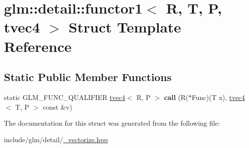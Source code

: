 \hypertarget{structglm_1_1detail_1_1functor1_3_01R_00_01T_00_01P_00_01tvec4_01_4}{}\section{glm\+:\+:detail\+:\+:functor1$<$ R, T, P, tvec4 $>$ Struct Template Reference}
\label{structglm_1_1detail_1_1functor1_3_01R_00_01T_00_01P_00_01tvec4_01_4}
\subsection*{Static Public Member Functions}
\begin{DoxyCompactItemize}
\item 
\mbox{\label{structglm_1_1detail_1_1functor1_3_01R_00_01T_00_01P_00_01tvec4_01_4_a65634749e4ae6e35d4cc898481d4681f}} 
static G\+L\+M\+\_\+\+F\+U\+N\+C\+\_\+\+Q\+U\+A\+L\+I\+F\+I\+ER \hyperlink{structglm_1_1tvec4}{tvec4}$<$ R, P $>$ {\bfseries call} (R($\ast$Func)(T x), \hyperlink{structglm_1_1tvec4}{tvec4}$<$ T, P $>$ const \&v)
\end{DoxyCompactItemize}


The documentation for this struct was generated from the following file\+:\begin{DoxyCompactItemize}
\item 
include/glm/detail/\hyperlink{__vectorize_8hpp}{\+\_\+vectorize.\+hpp}\end{DoxyCompactItemize}
